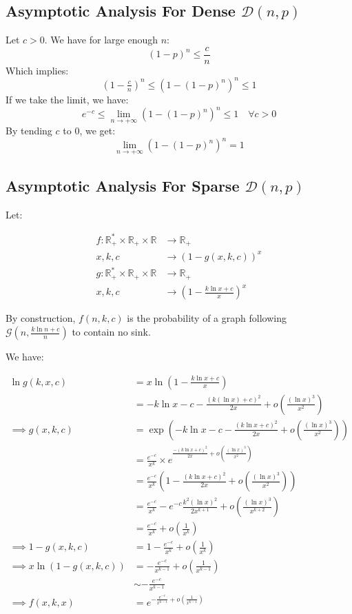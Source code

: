 \subsection{Asymptotic Analysis For Dense $\mathcal{D}(n,p)$}
Let $c>0.$ We have for large enough $n$:
$$
(1-p)^n \le \frac{c}{n}
$$
Which implies:
$$
(1-\tfrac{c}{n})^n \le (1-(1-p)^n)^n \le 1
$$
If we take the limit, we have:
$$
  e^{-c}\le \lim_{n\rightarrow +\infty}  (1-(1-p)^n)^n \le 1 \quad \forall c>0 
$$
By tending $c$ to $0$, we get:
$$
\lim_{n\rightarrow +\infty} (1-(1-p)^n)^n=1
$$
\subsection{Asymptotic Analysis For Sparse $\mathcal{D}(n,p)$}
Let:

\begin{align*}
	f:\mathbb{R}_+^*\times \mathbb{R}_+\times \mathbb{R} & \rightarrow \mathbb{R}_+\\
	x,k,c&\rightarrow (1-g(x,k,c))^x\\
	g:\mathbb{R}_+^*\times \mathbb{R}_+\times \mathbb{R} & \rightarrow \mathbb{R}_+\\
	x,k,c&\rightarrow \left(1-\frac{k \ln x+c}{x}\right)^x
\end{align*}

By construction, $f(n,k,c)$ is the probability of a graph following $\mathcal{G}(n,\tfrac{k\ln n+c}{n})$ to contain no sink.

We have:

\begin{align*}
	\ln g(k,x,c)&=x\ln\left(1-\frac{k\ln x+c}{x}\right)\\
	&=-k\ln x-c -\frac{(k(\ln x)+c)^2}{2x}+o\left(\frac{(\ln x)^3}{x^2}\right)\\
	\implies g(x,k,c)&=\exp\left(-k\ln x-c -\frac{(k\ln x+c)^2}{2x}+o\left(\frac{(\ln x)^3}{x^2}\right)\right) \\
	&=\frac{e^{-c}}{x^k}\times e^{\frac{-(k\ln x+c)^2}{2x}+o\left(\frac{(\ln x)^3}{x^2}\right)}\\
	&=\frac{e^{-c}}{x^k}\left(1-\frac{(k \ln x+c)^2}{2x}+o\left(\frac{(\ln x)^3}{x^2}\right)\right)  \\
	&=\frac{e^{-c}}{x^k}-e^{-c}\frac{k^2(\ln x)^2}{2x^{k+1}}+o\left(\frac{(\ln x)^3}{x^{k+2}}\right)\\
	&=\frac{e^{-c}}{x^k}+o\left(\frac{1}{x^k}\right)\\
	\implies 1- g(x,k,c)&=1-\frac{e^{-c}}{x^{k}} +o\left(\frac{1}{x^k}\right)\\
	\implies x\ln(1-g(x,k,c))&= -\frac{e^{-c}}{x^{k-1}}+o\left(\frac{1}{x^{k-1}}\right) \\
	&\sim -\frac{e^{-c}}{x^{k-1}}  \\
	\implies f(x,k,x) &= e^{-\frac{e^{-c}}{x^{k-1}}+o(\frac{1}{x^{k-1}})}
\end{align*}

